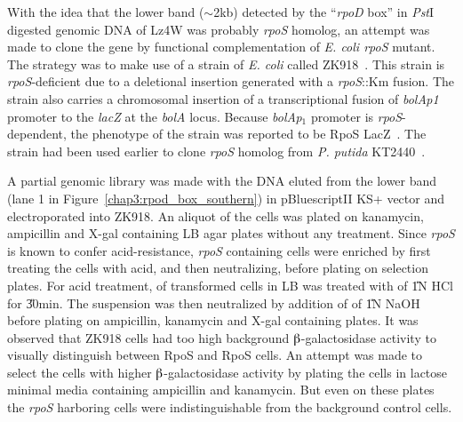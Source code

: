 With the idea that the lower band (\U{$\sim$2}{kb}) detected by
the ``\emph{rpoD} box'' in \emph{Pst}I digested genomic DNA of
Lz4W was probably \emph{rpoS} homolog, an attempt was made to
clone the gene by functional complementation of \emph{E. coli
rpoS} mutant. The strategy was to make use of a strain of \emph{E.
coli} called ZK918~\citep[see Table~\ref{ecolistrains} on page
\pageref{ecolistrains} for genotype]{Bohannon1991}. This strain is
\emph{rpoS}-deficient due to a deletional insertion generated with
a \emph{rpoS}::Km fusion. The strain also carries a chromosomal
insertion of a transcriptional fusion of \emph{bolAp1} promoter to
the \emph{lacZ} at the \emph{bolA} locus. Because
\emph{bolAp}$_{1}$ promoter is \emph{rpoS}-dependent, the
phenotype of the strain was reported to be RpoS\su{$-$}
LacZ\su{$-$}~\citep{Bohannon1991,Ramos1998}. The strain had been
used earlier to clone \emph{rpoS} homolog from \emph{P. putida}
KT2440~\citep{Ramos1998}.

A partial genomic library was made with the DNA eluted from the
lower band (lane 1 in Figure~\ref{chap3:rpod_box_southern}) in
pBluescriptII KS+ vector and electroporated into ZK918. An aliquot
of the cells was plated on kanamycin, ampicillin and X-gal
containing LB agar plates without any treatment. Since \emph{rpoS}
is known to confer acid-resistance, \emph{rpoS} containing cells
were enriched by first treating the cells with acid, and then
neutralizing, before plating on selection plates. For acid
treatment,  of transformed cells in LB was treated with
 of \U{1}{N} HCl for \U{30}{min}. The suspension was then
neutralized by addition of  of \U{1}{N} NaOH before
plating on ampicillin, kanamycin and X-gal containing plates. It
was observed that ZK918 cells had too high background
$\betaup$-galactosidase activity to visually distinguish between
RpoS\su{$-$} and RpoS\su{$+$} cells. An attempt was made to select
the cells with higher $\betaup$-galactosidase activity by plating
the cells in lactose minimal media containing ampicillin and
kanamycin. But even on these plates the \emph{rpoS} harboring
cells were indistinguishable from the background control cells.

